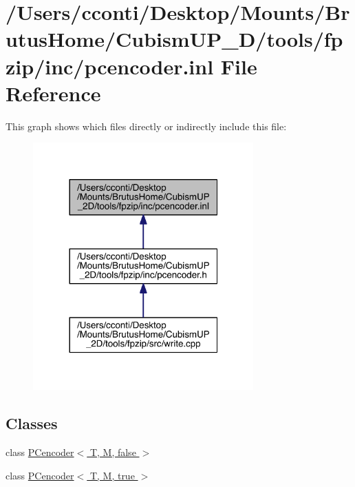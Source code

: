 \hypertarget{pcencoder_8inl}{}\section{/\+Users/cconti/\+Desktop/\+Mounts/\+Brutus\+Home/\+Cubism\+U\+P\+\_\+D/tools/fpzip/inc/pcencoder.inl File Reference}
\label{pcencoder_8inl}
This graph shows which files directly or indirectly include this file\+:\nopagebreak
\begin{figure}[H]
\begin{center}
\leavevmode
\includegraphics[width=240pt]{da/d03/pcencoder_8inl__dep__incl}
\end{center}
\end{figure}
\subsection*{Classes}
\begin{DoxyCompactItemize}
\item 
class \hyperlink{class_p_cencoder_3_01_t_00_01_m_00_01false_01_4}{P\+Cencoder$<$ T, M, false $>$}
\item 
class \hyperlink{class_p_cencoder_3_01_t_00_01_m_00_01true_01_4}{P\+Cencoder$<$ T, M, true $>$}
\end{DoxyCompactItemize}
